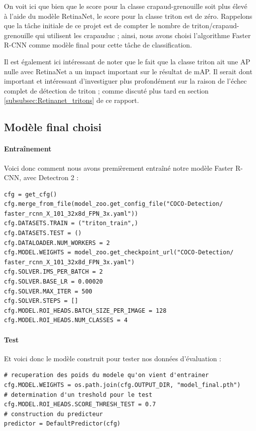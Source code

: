On voit ici que bien que le score pour la classe crapaud-grenouille soit plus élevé à l'aide du modèle RetinaNet, le score pour la classe triton est de zéro. Rappelons que la tâche initiale de ce projet est de compter le nombre de triton/crapaud-grenouille qui utilisent les crapauduc ; ainsi, nous avons choisi l'algorithme Faster R-CNN comme modèle final pour cette tâche de classification.\newline

Il est également ici intéressant de noter que le fait que la classe triton ait une AP nulle avec RetinaNet a un impact important sur le résultat de mAP. Il serait dont important et intéressant d'investiguer plus profondément sur la raison de l'échec complet de détection de triton ; comme discuté plus tard en section \ref{subsubsec:Retinanet_tritons} de ce rapport.

\subsection{Modèle final choisi}\label{anal:final_model}

\paragraph{Entraînement}

Voici donc comment nous avons premièrement entraîné notre modèle Faster R-CNN, avec Detectron 2 : 

\lstset{language=Python}
\lstset{style=Python}
\begin{lstlisting}
cfg = get_cfg()
cfg.merge_from_file(model_zoo.get_config_file("COCO-Detection/
faster_rcnn_X_101_32x8d_FPN_3x.yaml"))
cfg.DATASETS.TRAIN = ("triton_train",)
cfg.DATASETS.TEST = ()
cfg.DATALOADER.NUM_WORKERS = 2
cfg.MODEL.WEIGHTS = model_zoo.get_checkpoint_url("COCO-Detection/
faster_rcnn_X_101_32x8d_FPN_3x.yaml")  
cfg.SOLVER.IMS_PER_BATCH = 2 
cfg.SOLVER.BASE_LR = 0.00020 
cfg.SOLVER.MAX_ITER = 500 
cfg.SOLVER.STEPS = []   
cfg.MODEL.ROI_HEADS.BATCH_SIZE_PER_IMAGE = 128  
cfg.MODEL.ROI_HEADS.NUM_CLASSES = 4 
\end{lstlisting}


\paragraph{Test}

Et voici donc le modèle construit pour tester nos données d'évaluation : 

\lstset{style=Python}
\begin{lstlisting}
# recuperation des poids du modele qu'on vient d'entrainer
cfg.MODEL.WEIGHTS = os.path.join(cfg.OUTPUT_DIR, "model_final.pth")  
# determination d'un treshold pour le test
cfg.MODEL.ROI_HEADS.SCORE_THRESH_TEST = 0.7  
# construction du predicteur
predictor = DefaultPredictor(cfg)
\end{lstlisting}

